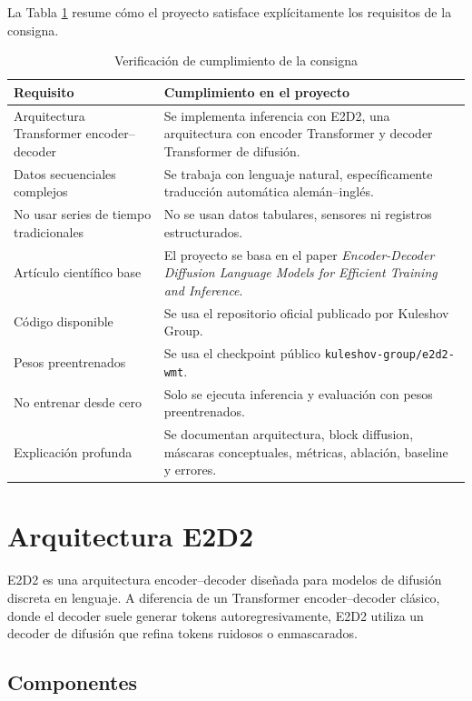 \documentclass[conference]{IEEEtran}
\begin{document}
La Tabla \ref{tab:consigna} resume cómo el proyecto satisface explícitamente los requisitos de la consigna.

\begin{table}[htbp]
\caption{Verificación de cumplimiento de la consigna}
\label{tab:consigna}
\centering
\begin{tabular}{p{}p{}}
\toprule
\textbf{Requisito} & \textbf{Cumplimiento en el proyecto} \\
\midrule
Arquitectura Transformer encoder--decoder & Se implementa inferencia con E2D2, una arquitectura con encoder Transformer y decoder Transformer de difusión. \\
Datos secuenciales complejos & Se trabaja con lenguaje natural, específicamente traducción automática alemán--inglés. \\
No usar series de tiempo tradicionales & No se usan datos tabulares, sensores ni registros estructurados. \\
Artículo científico base & El proyecto se basa en el paper \emph{Encoder-Decoder Diffusion Language Models for Efficient Training and Inference}. \\
Código disponible & Se usa el repositorio oficial publicado por Kuleshov Group. \\
Pesos preentrenados & Se usa el checkpoint público \texttt{kuleshov-group/e2d2-wmt}. \\
No entrenar desde cero & Solo se ejecuta inferencia y evaluación con pesos preentrenados. \\
Explicación profunda & Se documentan arquitectura, block diffusion, máscaras conceptuales, métricas, ablación, baseline y errores. \\
\bottomrule
\end{tabular}
\end{table}

\section{Arquitectura E2D2}

E2D2 es una arquitectura encoder--decoder diseñada para modelos de difusión discreta en lenguaje. A diferencia de un Transformer encoder--decoder clásico, donde el decoder suele generar tokens autoregresivamente, E2D2 utiliza un decoder de difusión que refina tokens ruidosos o enmascarados.

\subsection{Componentes}
\end{document}
